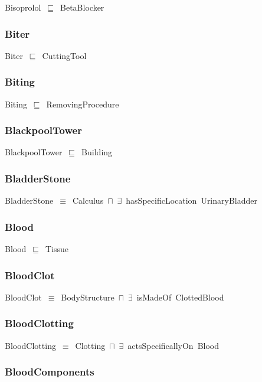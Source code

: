 \documentclass{article}
\begin{document}
Bisoprolol~\ensuremath{\sqsubseteq}~BetaBlocker~

\subsubsection*{Biter}

Biter~\ensuremath{\sqsubseteq}~CuttingTool~

\subsubsection*{Biting}

Biting~\ensuremath{\sqsubseteq}~RemovingProcedure~

\subsubsection*{BlackpoolTower}

BlackpoolTower~\ensuremath{\sqsubseteq}~Building~

\subsubsection*{BladderStone}

BladderStone~\ensuremath{\equiv}~Calculus~\ensuremath{\sqcap}~\ensuremath{\exists}~hasSpecificLocation~UrinaryBladder

\subsubsection*{Blood}

Blood~\ensuremath{\sqsubseteq}~Tissue~

\subsubsection*{BloodClot}

BloodClot~\ensuremath{\equiv}~BodyStructure~\ensuremath{\sqcap}~\ensuremath{\exists}~isMadeOf~ClottedBlood

\subsubsection*{BloodClotting}

BloodClotting~\ensuremath{\equiv}~Clotting~\ensuremath{\sqcap}~\ensuremath{\exists}~actsSpecificallyOn~Blood

\subsubsection*{BloodComponents}
\end{document}
